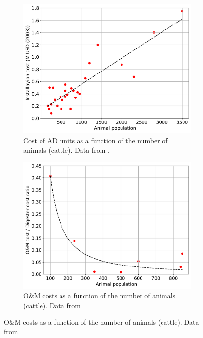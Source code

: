 \begin{refsection}[referencesCh4]
\begin{figure}[h]
	\centering
	\begin{subfigure}[t]{0.49\textwidth}
		\includegraphics[width=\textwidth, trim={0cm 0cm 0cm 0cm},clip]{gfx/AppendixC/AD_size_cost}
		\caption{Cost of AD units as a function of the number of animals (cattle). Data from \citet{AgSTAR2003}.}
		\label{fig:AD_size_cost}
	\end{subfigure}
	\quad
	\begin{subfigure}[t]{0.46\textwidth}
		\includegraphics[width=\textwidth]{gfx/AppendixC/AD_size_OM_Unit_cost} 
		\caption{O\&M costs as a function of the number of animals (cattle). Data from \citet{USDA_OM}}
		\label{fig:AD_size_OM_Unit_cost}
	\end{subfigure}
	

\end{figure}
\end{refsection}
